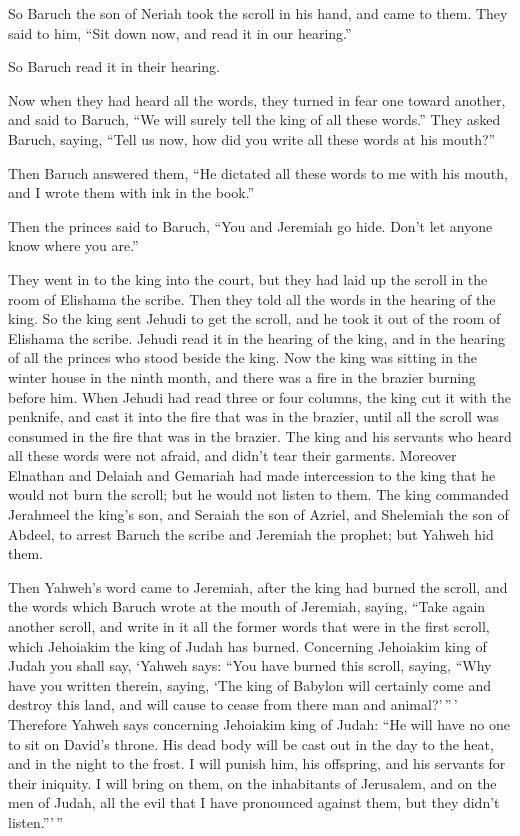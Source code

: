 So Baruch the son of Neriah took the scroll in his hand, and came to
them.  They said to him, ``Sit down now, and read it in
our hearing.''

So Baruch read it in their hearing.

 Now when they had heard all the words, they turned in
fear one toward another, and said to Baruch, ``We will surely tell the
king of all these words.''  They asked Baruch, saying,
``Tell us now, how did you write all these words at his mouth?''

 Then Baruch answered them, ``He dictated all these words
to me with his mouth, and I wrote them with ink in the book.''

 Then the princes said to Baruch, ``You and Jeremiah go
hide. Don't let anyone know where you are.''

 They went in to the king into the court, but they had
laid up the scroll in the room of Elishama the scribe. Then they told
all the words in the hearing of the king.  So the king
sent Jehudi to get the scroll, and he took it out of the room of
Elishama the scribe. Jehudi read it in the hearing of the king, and in
the hearing of all the princes who stood beside the king.
 Now the king was sitting in the winter house in the
ninth month, and there was a fire in the brazier burning before him.
 When Jehudi had read three or four columns, the king cut
it with the penknife, and cast it into the fire that was in the brazier,
until all the scroll was consumed in the fire that was in the brazier.
 The king and his servants who heard all these words were
not afraid, and didn't tear their garments.  Moreover
Elnathan and Delaiah and Gemariah had made intercession to the king that
he would not burn the scroll; but he would not listen to them.
 The king commanded Jerahmeel the king's son, and Seraiah
the son of Azriel, and Shelemiah the son of Abdeel, to arrest Baruch the
scribe and Jeremiah the prophet; but Yahweh hid them.

 Then Yahweh's word came to Jeremiah, after the king had
burned the scroll, and the words which Baruch wrote at the mouth of
Jeremiah, saying,  ``Take again another scroll, and write
in it all the former words that were in the first scroll, which
Jehoiakim the king of Judah has burned.  Concerning
Jehoiakim king of Judah you shall say, `Yahweh says: ``You have burned
this scroll, saying, ``Why have you written therein, saying, `The king
of Babylon will certainly come and destroy this land, and will cause to
cease from there man and animal?'\,''\,'  Therefore
Yahweh says concerning Jehoiakim king of Judah: ``He will have no one to
sit on David's throne. His dead body will be cast out in the day to the
heat, and in the night to the frost.  I will punish him,
his offspring, and his servants for their iniquity. I will bring on
them, on the inhabitants of Jerusalem, and on the men of Judah, all the
evil that I have pronounced against them, but they didn't listen.'''\,''

